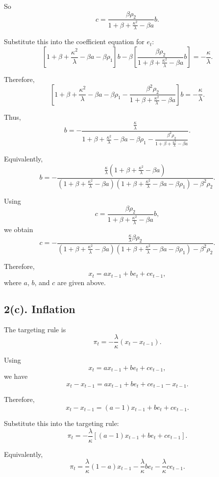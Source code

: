 \documentclass[12pt]{article}
\begin{document}
So
\[
c
=
\frac{\beta\rho_2}
{
1+\beta+\frac{\kappa^2}{\lambda}
-\beta a
}
b.
\]

Substitute this into the coefficient equation for $e_t$:
\[
\left[
1+\beta+\frac{\kappa^2}{\lambda}
-\beta a-\beta\rho_1
\right]b
-
\beta
\left[
\frac{\beta\rho_2}
{
1+\beta+\frac{\kappa^2}{\lambda}
-\beta a
}
b
\right]
=
-\frac{\kappa}{\lambda}.
\]

Therefore,
\[
\left[
1+\beta+\frac{\kappa^2}{\lambda}
-\beta a-\beta\rho_1
-
\frac{\beta^2\rho_2}
{
1+\beta+\frac{\kappa^2}{\lambda}
-\beta a
}
\right]b
=
-\frac{\kappa}{\lambda}.
\]

Thus,
\[
\boxed{
b
=
-\frac{\frac{\kappa}{\lambda}}
{
1+\beta+\frac{\kappa^2}{\lambda}
-\beta a-\beta\rho_1
-
\frac{\beta^2\rho_2}
{
1+\beta+\frac{\kappa^2}{\lambda}
-\beta a
}
}.
}
\]

Equivalently,
\[
\boxed{
b
=
-\frac{
\frac{\kappa}{\lambda}
\left(
1+\beta+\frac{\kappa^2}{\lambda}
-\beta a
\right)
}
{
\left(
1+\beta+\frac{\kappa^2}{\lambda}
-\beta a
\right)
\left(
1+\beta+\frac{\kappa^2}{\lambda}
-\beta a-\beta\rho_1
\right)
-
\beta^2\rho_2
}.
}
\]

Using
\[
c
=
\frac{\beta\rho_2}
{
1+\beta+\frac{\kappa^2}{\lambda}
-\beta a
}
b,
\]
we obtain
\[
\boxed{
c
=
-\frac{
\frac{\kappa}{\lambda}\beta\rho_2
}
{
\left(
1+\beta+\frac{\kappa^2}{\lambda}
-\beta a
\right)
\left(
1+\beta+\frac{\kappa^2}{\lambda}
-\beta a-\beta\rho_1
\right)
-
\beta^2\rho_2
}.
}
\]

Therefore,
\[
\boxed{
x_t=a x_{t-1}+b e_t+c e_{t-1},
}
\]
where $a$, $b$, and $c$ are given above.

\subsection*{2(c). Inflation}

The targeting rule is
\[
\pi_t
=
-\frac{\lambda}{\kappa}(x_t-x_{t-1}).
\]

Using
\[
x_t=a x_{t-1}+b e_t+c e_{t-1},
\]
we have
\[
x_t-x_{t-1}
=
a x_{t-1}+b e_t+c e_{t-1}-x_{t-1}.
\]

Therefore,
\[
x_t-x_{t-1}
=
(a-1)x_{t-1}+b e_t+c e_{t-1}.
\]

Substitute this into the targeting rule:
\[
\boxed{
\pi_t
=
-\frac{\lambda}{\kappa}
\left[
(a-1)x_{t-1}
+
b e_t
+
c e_{t-1}
\right].
}
\]

Equivalently,
\[
\boxed{
\pi_t
=
\frac{\lambda}{\kappa}(1-a)x_{t-1}
-
\frac{\lambda}{\kappa}b e_t
-
\frac{\lambda}{\kappa}c e_{t-1}.
}
\]
\end{document}
